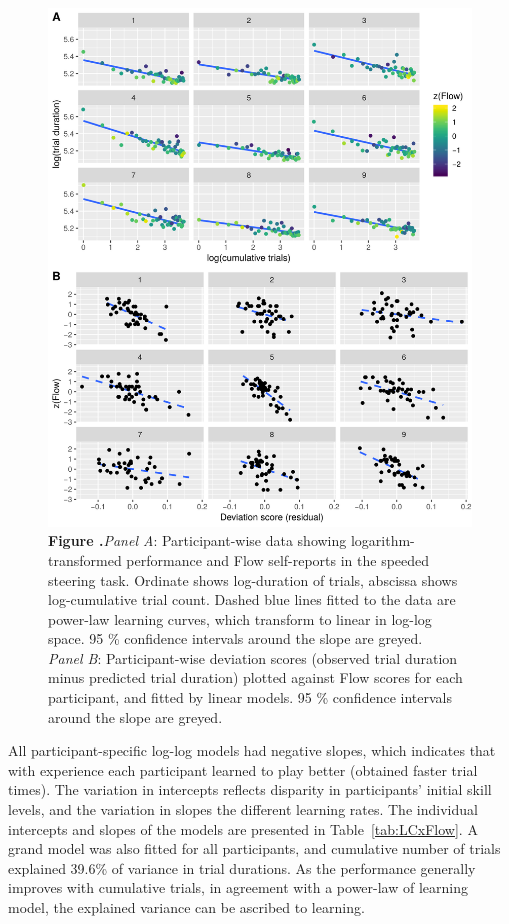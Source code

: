 \documentclass{frontierstyle/frontiersSCNS}
\begin{document}
\begin{figure}[!p]
	\centering
	\includegraphics[width=\linewidth]{3_cogcar_main}
	\textbf{\label{fig:flowVperf} Figure .}{{\it Panel A}: Participant-wise data showing logarithm-transformed performance and Flow self-reports in the speeded steering task. Ordinate shows log-duration of trials, abscissa shows log-cumulative trial count. Dashed blue lines fitted to the data are power-law learning curves, which transform to linear in log-log space. 95 \% confidence intervals around the slope are greyed.\\
	{\it Panel B}: Participant-wise deviation scores (observed trial duration minus predicted trial duration) plotted against Flow scores for each participant, and fitted by linear models. 95 \% confidence intervals around the slope are greyed.}
\end{figure}

All participant-specific log-log models had negative slopes, which indicates that with experience each participant learned to play better (obtained faster trial times). The variation in intercepts reflects disparity in participants' initial skill levels, and the variation in slopes the different learning rates. The individual intercepts and slopes of the models are presented in Table~\ref{tab:LCxFlow}. A grand model was also fitted for all participants, and cumulative number of trials explained 39.6\% of variance in trial durations. As the performance generally improves with cumulative trials, in agreement with a power-law of learning model, the explained variance can be ascribed to learning.
\end{document}
